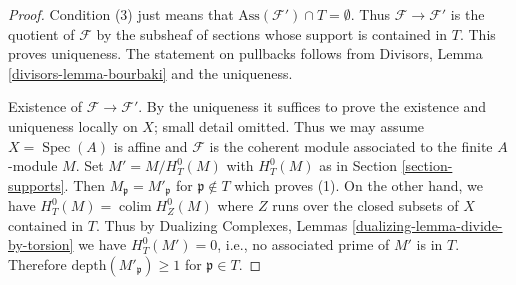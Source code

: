 \documentclass[10pt,a4paper]{amsart}
\theoremstyle{plain}
\theoremstyle{definition}
\theoremstyle{remark}
\numberwithin{equation}{subsection}
\def\colim{\mathop{\mathrm{colim}}\nolimits}
\def\Spec{\mathop{\mathrm{Spec}}}
\begin{document}
\begin{proof}
Condition (3) just means that $\text{Ass}(\mathcal{F}') \cap T = \emptyset$.
Thus $\mathcal{F} \to \mathcal{F}'$ is the quotient of $\mathcal{F}$
by the subsheaf of sections whose support is contained in $T$.
This proves uniqueness. The statement on pullbacks follows from
Divisors, Lemma \ref{divisors-lemma-bourbaki}
and the uniqueness.

\medskip\noindent
Existence of $\mathcal{F} \to \mathcal{F}'$.
By the uniqueness it suffices to prove the
existence and uniqueness locally on $X$; small detail omitted.
Thus we may assume $X = \Spec(A)$ is affine and $\mathcal{F}$
is the coherent module associated to the finite $A$-module $M$.
Set $M' = M / H^0_T(M)$ with $H^0_T(M)$ as in Section \ref{section-supports}.
Then $M_\mathfrak p = M'_\mathfrak p$ for $\mathfrak p \not \in T$
which proves (1). On the other hand, we have
$H^0_T(M) = \colim H^0_Z(M)$ where $Z$ runs over the closed
subsets of $X$ contained in $T$. Thus by
Dualizing Complexes, Lemmas \ref{dualizing-lemma-divide-by-torsion}
we have $H^0_T(M') = 0$, i.e., no associated prime
of $M'$ is in $T$. Therefore $\text{depth}(M'_\mathfrak p) \geq 1$
for $\mathfrak p \in T$.
\end{proof}
\end{document}
